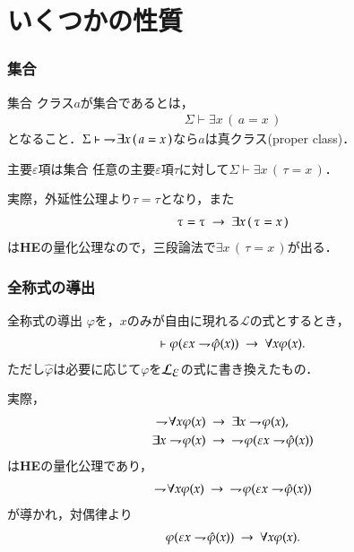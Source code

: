 \documentclass[dvipdfmx,10pt,notheorems]{beamer}
\theoremstyle{definition}
\newcommand{\lang}[1]{\mathcal{L}_{\scalebox{1.2}{$#1$}}} %
\newcommand{\negation}{\rightharpoondown\hspace{-0.25em}} %
\newcommand{\rarrow}{\hspace{0.25em}\rightarrow\hspace{0.25em}} %
\begin{document}
\section{いくつかの性質}
\begin{frame}\frametitle{集合}
	\begin{exampleblock}{集合}
	クラス$a$が集合であるとは，
	\begin{align}
		\Sigma \vdash \exists x\, (\, a = x\, )
	\end{align}
	となること．$\Sigma \vdash\ \negation \exists x\, (\, a = x\, )$なら$a$は真クラス(proper class)．
	\end{exampleblock}
	
	\begin{block}{主要$\varepsilon$項は集合}
		任意の主要$\varepsilon$項$\tau$に対して$\Sigma \vdash \exists x\, (\, \tau = x\, )$．
	\end{block}
	実際，外延性公理より$\tau = \tau$となり，また
	\begin{align}
		\tau = \tau \rarrow \exists x\, (\, \tau = x\, )
	\end{align}
	は{\bf HE}の量化公理なので，三段論法で$\exists x\, (\, \tau = x\, )$が出る．
\end{frame}

\begin{frame}\frametitle{全称式の導出}
	\begin{block}{全称式の導出}
		$\varphi$を，$x$のみが自由に現れる$\mathcal{L}$の式とするとき，
		\begin{align}
			\vdash \varphi(\varepsilon x \negation \hat{\varphi}(x)) \rarrow \forall x \varphi(x).
		\end{align}
		ただし$\hat{\varphi}$は必要に応じて$\varphi$を$\lang{\varepsilon}$の式に書き換えたもの．
	\end{block}
	実際，
	\begin{align}
		\negation \forall x \varphi(x) &\rarrow \exists x \negation \varphi(x), \\
		\exists x \negation \varphi(x) &\rarrow\ \negation \varphi(\varepsilon x \negation \hat{\varphi}(x))
	\end{align}
	は{\bf HE}の量化公理であり，
	\begin{align}
		\negation \forall x \varphi(x) \rarrow\ \negation \varphi(\varepsilon x \negation \hat{\varphi}(x))
	\end{align}
	が導かれ，対偶律より
	\begin{align}
		\varphi(\varepsilon x \negation \hat{\varphi}(x)) \rarrow \forall x \varphi(x).
	\end{align}
\end{frame}
\end{document}
